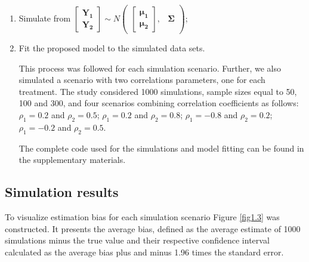 \documentclass[useAMS,referee]{biom}
\begin{document}
\begin{enumerate}
\item Simulate from $	\begin{bmatrix}\mathbf{Y_1}\\
\mathbf{Y_2}
\end{bmatrix} \sim  N
\begin{pmatrix}
\begin{bmatrix}
\boldsymbol{\mu_1}\\
\boldsymbol{\mu_2}
\end{bmatrix}\!\!,&
\boldsymbol{\Sigma}
\end{pmatrix}
$;\\

\item Fit the proposed model to the simulated data sets.

This process was followed for each simulation scenario.
Further, we also simulated a scenario with two correlations parameters, one for each treatment. The study considered 1000 simulations, sample sizes equal to 50, 100 and 300, and four scenarios combining correlation coefficients as follows: $\rho_1=0.2$ and $\rho_2=0.5$; $\rho_1=0.2$ and $\rho_2=0.8$; $\rho_1=-0.8$ and $\rho_2=0.2$; $\rho_1=-0.2$ and $\rho_2=0.5$.

The complete code used for the simulations and model fitting can be found in the supplementary materials.

\end{enumerate}



\subsection{Simulation results}


To visualize estimation bias for each simulation scenario Figure \ref{fig1.3}
was constructed. It presents the average bias, defined as the average estimate of 1000 simulations minus the true value and their respective confidence interval calculated as the average bias plus and minus 1.96 times the standard error.
\end{document}
